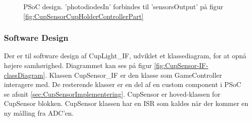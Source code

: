 \documentclass[Rapport/Rapport_main.tex]{subfiles}
\begin{document}
\begin{figure}[H]
    \centering
    \caption{PSoC design. 'photodiodesIn' forbindes til 'sensorsOutput' på figur \ref{fig:CupSensorCupHolderControllerPart}}
    \label{fig:CupSensorPSoCDesign}
\end{figure}

\subsubsection{Software Design}
Der er til software design af CupLight\_IF, udviklet et klassediagram, for at opnå højere samhørighed. Diagrammet kan ses på figur \ref{fig:CupSensor-IF-classDiagram}.  Klassen CupSensor\_IF er den klasse som GameController interagere med. De resterende klasser er en del af en custom component i PSoC se afsnit \ref{sec:CupSensorImplementering}. CupSensor er hoved-klassen for CupSensor blokken. CupSensor klassen har en ISR som kaldes når der kommer en ny målling fra ADC'en. 
 
\end{document}
